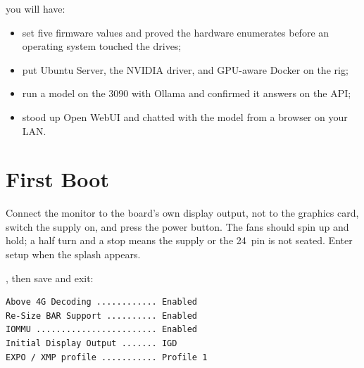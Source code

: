  you will have:
\begin{itemize}
    \item set five firmware values and proved the hardware enumerates before an
    operating system touched the drives;
    \item put Ubuntu Server, the NVIDIA driver, and GPU-aware Docker on the rig;
    \item run a model on the 3090 with Ollama and confirmed it answers on the API;
    \item stood up Open WebUI and chatted with the model from a browser on your LAN.
\end{itemize}


\section{First Boot}

 Connect the monitor to the board's own display output, not to
the graphics card, switch the supply on, and press the power button. The fans should
spin up and hold; a half turn and a stop means the supply or the 24~pin is not
seated. Enter setup when the splash appears.


, then save and exit:

\begin{verbatim}
Above 4G Decoding ............ Enabled
Re-Size BAR Support .......... Enabled
IOMMU ........................ Enabled
Initial Display Output ....... IGD
EXPO / XMP profile ........... Profile 1
\end{verbatim}


